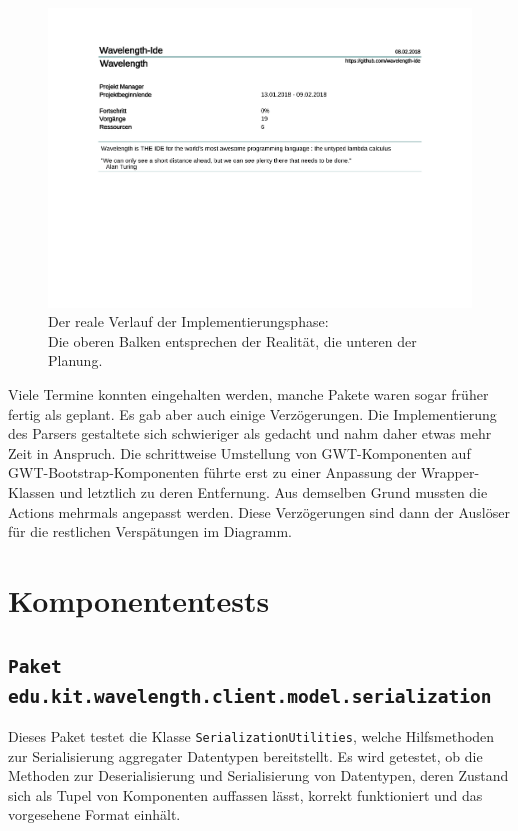 \documentclass[parskip=full,11pt]{scrartcl}
\begin{document}
\begin{figure}[H]
\hspace*{-2cm}
\includegraphics[trim={0, 7cm, 0, 0}, clip, scale=0.65, page=4]{Implementierungsplan/Implementierungsplan.pdf}
\caption[caption]{Der reale Verlauf der Implementierungsphase: \\\hspace{\textwidth}
Die oberen Balken entsprechen der Realität, die unteren der Planung.}
\end{figure}

Viele Termine konnten eingehalten werden, manche Pakete waren sogar früher fertig als geplant.
Es gab aber auch einige Verzögerungen.
Die Implementierung des Parsers gestaltete sich schwieriger als gedacht und nahm daher etwas mehr Zeit in Anspruch.
Die schrittweise Umstellung von GWT-Komponenten auf GWT-Bootstrap-Komponenten führte erst zu einer Anpassung der
Wrapper-Klassen und letztlich zu deren Entfernung.
Aus demselben Grund mussten die Actions mehrmals angepasst werden.
Diese Verzögerungen sind dann der Auslöser für die restlichen Verspätungen im Diagramm.

\newpage
\section{Komponententests}
\subsection{\texttt{Paket edu.kit.wavelength.client.model.serialization}}
Dieses Paket testet die Klasse \texttt{SerializationUtilities}, welche Hilfsmethoden zur Serialisierung aggregater Datentypen
bereitstellt. Es wird getestet, ob die Methoden zur Deserialisierung und Serialisierung von Datentypen, deren Zustand sich als Tupel
von Komponenten auffassen lässt, korrekt funktioniert und das vorgesehene Format einhält.
\end{document}
